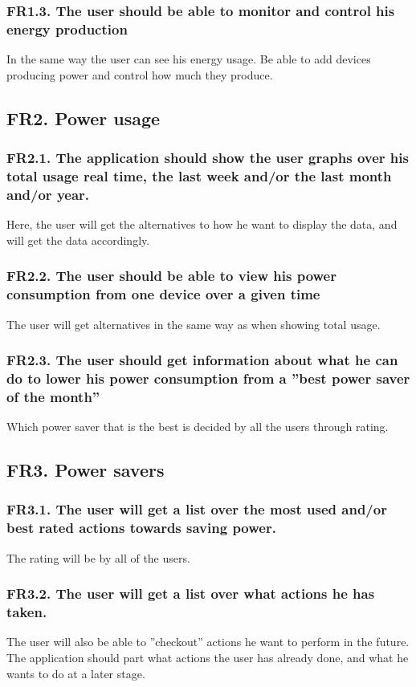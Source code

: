 \subsubsection{FR1.3. The user should be able to monitor and control his energy production}
In the same way the user can see his energy usage. Be able to add devices producing power and control how much they produce.


\subsection{FR2. Power usage}
\subsubsection{FR2.1. The application should show the user graphs over his total usage real time, the last week and/or the last month and/or year.}
Here, the user will get the alternatives to how he want to display the data, and will get the data accordingly.

\subsubsection{FR2.2. The user should be able to view his power consumption from one device over a given time}
The user will get alternatives in the same way as when showing total usage.

\subsubsection{FR2.3. The user should get information about what he can do to lower his power consumption from a ''best power saver of the month''}
 Which power saver that is the best is decided by all the users through rating.

\subsection{FR3. Power savers}

\subsubsection{FR3.1. The user will get a list over the most used and/or best rated actions towards saving power.}
The rating will be by all of the users.

\subsubsection{FR3.2. The user will get a list over what actions he has taken.}
The user will also be able to ''checkout'' actions he want to perform in the future. The application should part what actions the user has already done, and what he wants to do at a later stage.

